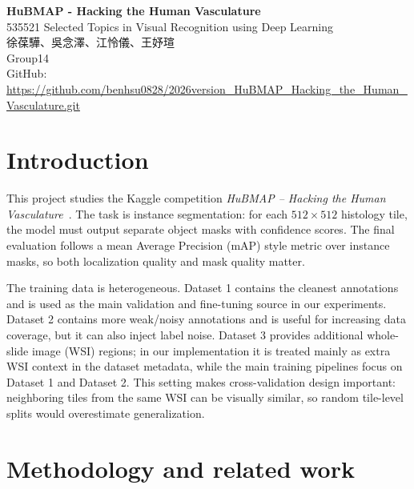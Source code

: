 \documentclass[12pt, a4paper]{article}
\begin{document}
\begin{center}
    \LARGE \textbf{HuBMAP - Hacking the Human Vasculature}\\[0.4em]
    \large 535521 Selected Topics in Visual Recognition using Deep Learning\\
    \large 徐葆驊、吳念澤、江怜儀、王妤瑄\\
    \normalsize Group14\\
    \vspace{0.5em}
    \normalsize GitHub: \url{https://github.com/benhsu0828/2026version_HuBMAP_Hacking_the_Human_Vasculature.git}
\end{center}

\vspace{1em}

\begingroup
\footnotesize

\section{Introduction}
\label{sec:intro}

This project studies the Kaggle competition \textit{HuBMAP -- Hacking the Human Vasculature}~\cite{hubmap2023}. The task is instance segmentation: for each $512 \times 512$ histology tile, the model must output separate object masks with confidence scores. The final evaluation follows a mean Average Precision (mAP) style metric over instance masks, so both localization quality and mask quality matter.

The training data is heterogeneous. Dataset 1 contains the cleanest annotations and is used as the main validation and fine-tuning source in our experiments. Dataset 2 contains more weak/noisy annotations and is useful for increasing data coverage, but it can also inject label noise. Dataset 3 provides additional whole-slide image (WSI) regions; in our implementation it is treated mainly as extra WSI context in the dataset metadata, while the main training pipelines focus on Dataset 1 and Dataset 2. This setting makes cross-validation design important: neighboring tiles from the same WSI can be visually similar, so random tile-level splits would overestimate generalization.

\section{Methodology and related work}
\label{sec:top}
\end{document}
